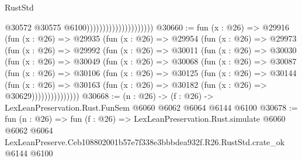 \begin{lexlean}{RustStd}
\begin{coremodule}
                                              @30572
                                              @30575
                                              @6100)))))))))))))))))))))
@30660 := fun (x : @26) =>
  @29916
    (fun (x : @26) =>
    @29935
      (fun (x : @26) =>
      @29954
        (fun (x : @26) =>
        @29973
          (fun (x : @26) =>
          @29992
            (fun (x : @26) =>
            @30011
              (fun (x : @26) =>
              @30030
                (fun (x : @26) =>
                @30049
                  (fun (x : @26) =>
                  @30068
                    (fun (x : @26) =>
                    @30087
                      (fun (x : @26) =>
                      @30106
                        (fun (x : @26) =>
                        @30125
                          (fun (x : @26) =>
                          @30144
                            (fun (x : @26) =>
                            @30163 (fun (x : @26) => @30182 (fun (x : @26) => @30629)))))))))))))))
@30668 := (n : @26) -> (f : @26) -> LexLeanPreservation.Rust.FunSem @6060 @6062 @6064 @6144 @6100
@30678 := fun (n : @26) =>
  fun (f : @26) =>
  LexLeanPreservation.Rust.simulate
    @6060
    @6062
    @6064
    LexLeanPreserve.Ceb108802001b57e7f338e3bbbdea932f.R26.RustStd.crate_ok
    @6144
    @6100
\end{coremodule}
\end{lexlean}
